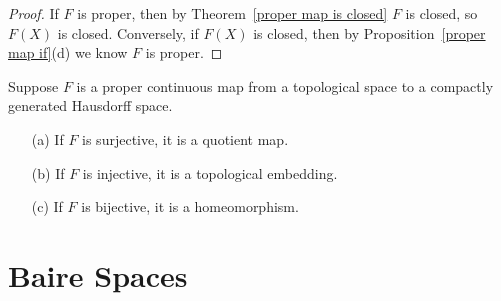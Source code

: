 \begin{proof}
If $F$ is proper, then by Theorem~\ref{proper map is closed} $F$ is closed, so $F(X)$ is closed. Conversely, if $F(X)$ is closed, then by Proposition~\ref{proper map if}(d) we know $F$ is proper.
\end{proof}
\begin{corollary}
Suppose $F$ is a proper continuous map from a topological space to a compactly generated Hausdorff space.
\begin{itemize}
\item[(a)] If $F$ is surjective, it is a quotient map.
\item[(b)] If $F$ is injective, it is a topological embedding.
\item[(c)] If $F$ is bijective, it is a homeomorphism.
\end{itemize}
\end{corollary}
\section{Baire Spaces}
